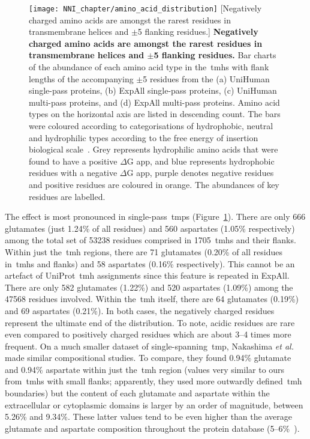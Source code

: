 \begin{figure}[!ht]
\centering
\texttt{[image: NNI\_chapter/amino\_acid\_distribution]}
[Negatively charged amino acids are amongst the rarest residues in transmembrane helices and $\pm$5 flanking residues.] {\textbf{Negatively charged amino acids are amongst the rarest residues in transmembrane helices and $\pm$5 flanking residues.} Bar charts of the abundance of each amino acid type in the~\gls{tmh}s with flank lengths of the accompanying $\pm$5 residues from the (a) UniHuman single-pass proteins, (b) ExpAll single-pass proteins, (c) UniHuman multi-pass proteins, and (d) ExpAll multi-pass proteins.
Amino acid types on the horizontal axis are listed in descending count.
The bars were coloured according to categorisations of hydrophobic, neutral and hydrophilic types according to the free energy of insertion biological scale~\cite{Hessa2005}.
Grey represents hydrophilic amino acids that were found to have a positive $\Delta$G app, and blue represents hydrophobic residues with a negative $\Delta$G app, purple denotes negative residues and positive residues are coloured in orange.
The abundances of key residues are labelled.}

\label{fig:amino_acid_distribution}
\end{figure}

The effect is most pronounced in single-pass~\gls{tmp}s (Figure~\ref{fig:amino_acid_distribution}).
There are only 666 glutamates (just 1.24\% of all residues) and 560 aspartates (1.05\% respectively) among the total set of 53238 residues comprised in 1705~\gls{tmh}s and their flanks.
Within just the~\gls{tmh} regions, there are 71 glutamates (0.20\% of all residues in~\gls{tmh}s and flanks) and 58 aspartates (0.16\% respectively).
This cannot be an artefact of UniProt~\gls{tmh} assignments since this feature is repeated in ExpAll.
There are only 582 glutamates (1.22\%) and 520 aspartates (1.09\%) among the 47568 residues involved.
Within the~\gls{tmh} itself, there are 64 glutamates (0.19\%) and 69 aspartates (0.21\%).
In both cases, the negatively charged residues represent the ultimate end of the distribution.
To note, acidic residues are rare even compared to positively charged residues which are about 3--4 times more frequent.
On a much smaller dataset of single-spanning~\gls{tmp}, Nakashima \textit{et al.}
~\cite{Nakashima1992} made similar compositional studies.
To compare, they found 0.94\% glutamate and 0.94\% aspartate within just the~\gls{tmh} region (values very similar to ours from~\gls{tmh}s with small flanks; apparently, they used more outwardly defined~\gls{tmh} boundaries) but the content of each glutamate and aspartate within the extracellular or cytoplasmic domains is larger by an order of magnitude, between 5.26\% and 9.34\%.
These latter values tend to be even higher than the average glutamate and aspartate composition throughout the protein database (5--6\%~\cite{Nakashima1992}).

